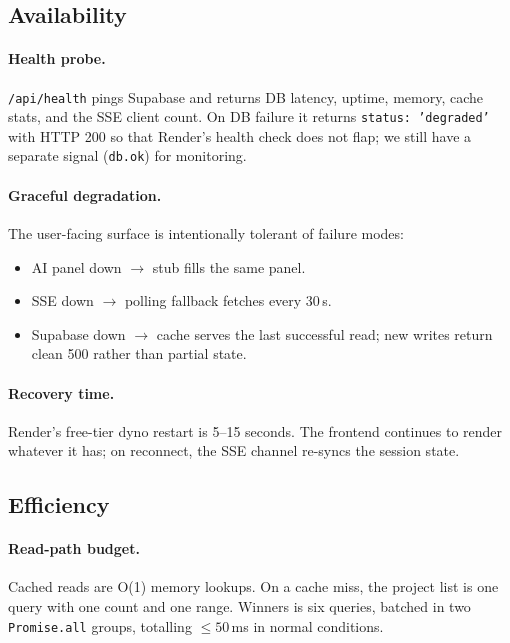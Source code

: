 \subsection{Availability}

\paragraph{Health probe.} \texttt{/api/health} pings Supabase and returns
DB latency, uptime, memory, cache stats, and the SSE client count. On
DB failure it returns \texttt{status: 'degraded'} with HTTP 200 so that
Render's health check does not flap; we still have a separate signal
(\texttt{db.ok}) for monitoring.

\paragraph{Graceful degradation.} The user-facing surface is
intentionally tolerant of failure modes:

\begin{itemize}[leftmargin=*]
  \item AI panel down $\to$ stub fills the same panel.
  \item SSE down $\to$ polling fallback fetches every 30\,s.
  \item Supabase down $\to$ cache serves the last successful read; new
        writes return clean 500 rather than partial state.
\end{itemize}

\paragraph{Recovery time.} Render's free-tier dyno restart is 5--15
seconds. The frontend continues to render whatever it has; on
reconnect, the SSE channel re-syncs the session state.

\subsection{Efficiency}

\paragraph{Read-path budget.} Cached reads are O(1) memory lookups.
On a cache miss, the project list is one query with one count and one
range. Winners is six queries, batched in two \texttt{Promise.all}
groups, totalling $\leq 50$\,ms in normal conditions.

